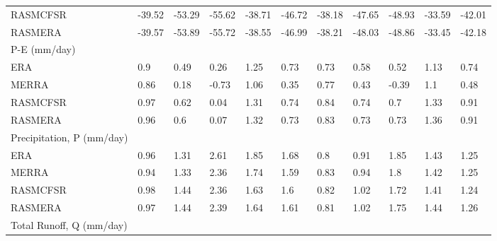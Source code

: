 \begin{table}[]
{\begin{tabular}{lllllllllll}
RASMCFSR                                       & -39.52                       & -53.29 & -55.62 & -38.71 & -46.72 & -38.18 & -47.65 & -48.93 & -33.59 & -42.01 \\
RASMERA                                        & -39.57                       & -53.89 & -55.72 & -38.55 & -46.99 & -38.21 & -48.03 & -48.86 & -33.45 & -42.18 \\
P-E (mm/day)                                   &                              &        &        &        &        &        &        &        &        &        \\
ERA                                            & 0.9                          & 0.49   & 0.26   & 1.25   & 0.73   & 0.73   & 0.58   & 0.52   & 1.13   & 0.74   \\
MERRA                                          & 0.86                         & 0.18   & -0.73  & 1.06   & 0.35   & 0.77   & 0.43   & -0.39  & 1.1    & 0.48   \\
RASMCFSR                                       & 0.97                         & 0.62   & 0.04   & 1.31   & 0.74   & 0.84   & 0.74   & 0.7    & 1.33   & 0.91   \\
RASMERA                                        & 0.96                         & 0.6    & 0.07   & 1.32   & 0.73   & 0.83   & 0.73   & 0.73   & 1.36   & 0.91   \\
Precipitation, P (mm/day)                      &                              &        &        &        &        &        &        &        &        &        \\
ERA                                            & 0.96                         & 1.31   & 2.61   & 1.85   & 1.68   & 0.8    & 0.91   & 1.85   & 1.43   & 1.25   \\
MERRA                                          & 0.94                         & 1.33   & 2.36   & 1.74   & 1.59   & 0.83   & 0.94   & 1.8    & 1.42   & 1.25   \\
RASMCFSR                                       & 0.98                         & 1.44   & 2.36   & 1.63   & 1.6    & 0.82   & 1.02   & 1.72   & 1.41   & 1.24   \\
RASMERA                                        & 0.97                         & 1.44   & 2.39   & 1.64   & 1.61   & 0.81   & 1.02   & 1.75   & 1.44   & 1.26   \\
Total Runoff, Q (mm/day)                       &                              &        &        &        &        &        &        &        &        &        \\

\end{tabular}}
\end{table}
